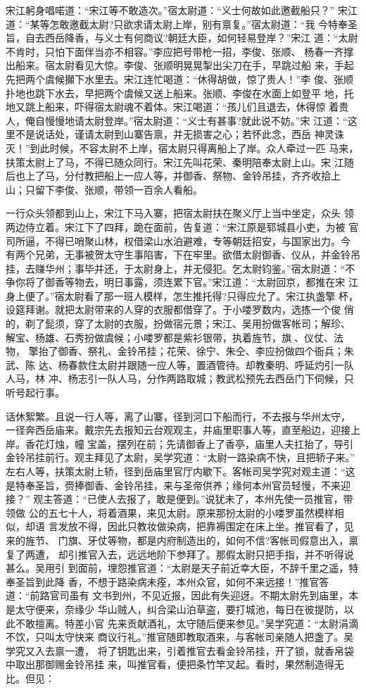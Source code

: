 宋江躬身唱喏道：“宋江等不敢造次。”宿太尉道：“义士何故如此邀截船只？”
宋江道：“某等怎敢邀截太尉?只欲求请太尉上岸，别有禀复。”宿太尉道：“我
今特奉圣旨，自去西岳降香，与义士有何商议?朝廷大臣，如何轻易登岸？”宋江
道：“太尉不肯时，只怕下面伴当亦不相容。”李应把号带枪一招，李俊、张顺、
杨春一齐撑出船来。宿太尉看见大惊。李俊、张顺明晃晃掣出尖刀在手，早跳过船
来，手起先把两个虞候攧下水里去。宋江连忙喝道：“休得胡做，惊了贵人！”李
俊、张顺扑地也跳下水去，早把两个虞候又送上船来。张顺、李俊在水面上如登平
地，托地又跳上船来，吓得宿太尉魂不着体。宋江喝道：“孩儿们且退去，休得惊
着贵人，俺自慢慢地请太尉登岸。”宿太尉道：“义士有甚事?就此说不妨。”宋
江道：“这里不是说话处，谨请太尉到山寨告禀，并无损害之心；若怀此念，西岳
神灵诛灭！”到此时候，不容太尉不上岸，宿太尉只得离船上了岸。众人牵过一匹
马来，扶策太尉上了马，不得已随众同行。宋江先叫花荣、秦明陪奉太尉上山。宋
江随后也上了马，分付教把船上一应人等，并御香、祭物、金铃吊挂，齐齐收拾上
山；只留下李俊、张顺，带领一百余人看船。

一行众头领都到山上，宋江下马入寨，把宿太尉扶在聚义厅上当中坐定，众头
领两边侍立着。宋江下了四拜，跪在面前，告复道：“宋江原是郓城县小吏，为被
官司所逼，不得已哨聚山林，权借梁山水泊避难，专等朝廷招安，与国家出力。今
有两个兄弟，无事被贺太守生事陷害，下在牢里。欲借太尉御香、仪从，并金铃吊
挂，去赚华州；事毕并还，于太尉身上，并无侵犯。乞太尉钧鉴。”宿太尉道：“不
争你将了御香等物去，明日事露，须连累下官。”宋江道：“太尉回京，都推在宋
江身上便了。”宿太尉看了那一班人模样，怎生推托得?只得应允了。宋江执盏擎
杯，设筵拜谢。就把太尉带来的人穿的衣服都借穿了。于小喽罗数内，选拣一个俊
俏的，剃了髭须，穿了太尉的衣服，扮做宿元景；宋江、吴用扮做客帐司；解珍、
解宝、杨雄、石秀扮做虞候；小喽罗都是紫衫银带，执着旌节，旗、仪仗、法物，
擎抬了御香、祭礼、金铃吊挂；花荣、徐宁、朱仝、李应扮做四个衙兵；朱武、陈
达、杨春款住太尉并跟随一应人等，置酒管待。却教秦明、呼延灼引一队人马，林
冲、杨志引一队人马，分作两路取城；教武松预先去西岳门下伺候，只听号起行事。

话休絮繁。且说一行人等，离了山寨，径到河口下船而行，不去报与华州太守，
一径奔西岳庙来。戴宗先去报知云台观观主，并庙里职事人等，直至船边，迎接上
岸。香花灯烛，幢宝盖，摆列在前；先请御香上了香亭，庙里人夫扛抬了，导引
金铃吊挂前行。观主拜见了太尉，吴学究道：“太尉一路染病不快，且把轿子来。”
左右人等，扶策太尉上轿，径到岳庙里官厅内歇下。客帐司吴学究对观主道：“这
是特奉圣旨，赍捧御香、金铃吊挂，来与圣帝供养；缘何本州官员轻慢，不来迎接？”
观主答道：“已使人去报了，敢是便到。”说犹未了，本州先使一员推官，带领做
公的五七十人，将着酒果，来见太尉。原来那扮太尉的小喽罗虽然模样相似，却语
言发放不得，因此只教妆做染病，把靠褥围定在床上坐。推官看了，见来的旌节、
门旗、牙仗等物，都是内府制造出的，如何不信?客帐司假意出入，禀复了两遭，
却引推官入去，远远地阶下参拜了。那假太尉只把手指，并不听得说甚么。吴用引
到面前，埋怨推官道：“太尉是天子前近幸大臣，不辞千里之遥，特奉圣旨到此降
香，不想于路染病未痊，本州众官，如何不来远接！”推官答道：“前路官司虽有
文书到州，不见近报，因此有失迎迓。不期太尉先到庙里，本是太守便来，奈缘少
华山贼人，纠合梁山泊草盗，要打城池，每日在彼提防，以此不敢擅离。特差小官
先来贡献酒礼，太守随后便来参见。”吴学究道：“太尉涓滴不饮，只叫太守快来
商议行礼。”推官随即教取酒来，与客帐司亲随人把盏了。吴学究又入去禀一遭，
将了钥匙出来，引着推官去看金铃吊挂，开了锁，就香帛袋中取出那御赐金铃吊挂
来，叫推官看，便把条竹竿叉起。看时，果然制造得无比。但见：

